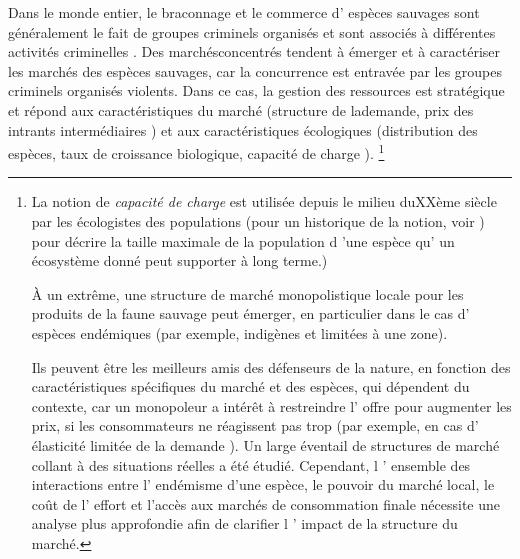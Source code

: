 \begin{displayquote}
\begin{displayquote}
\begin{displayquote}
  Dans le monde entier, le braconnage et le commerce d' espèces sauvages sont généralement le fait de groupes criminels organisés et sont associés à différentes activités criminelles \citep{mozer_introduction_2023}.    Des marchésconcentrés tendent à émerger et à caractériser les marchés des espèces sauvages, car la concurrence est entravée par les groupes criminels organisés violents. Dans ce cas, la gestion des ressources est stratégique et répond aux caractéristiques du marché (structure de lademande, prix des intrants intermédiaires ) et aux caractéristiques écologiques (distribution des espèces, taux de croissance biologique, capacité de charge ). \footnote{La notion de \textit{capacité de charge} est utilisée depuis le milieu duXXème siècle par les écologistes des populations (pour un historique de la notion, voir \cite{sayre_carrying_2008}) pour décrire la taille maximale de la population d 'une espèce qu' un écosystème donné peut supporter à long terme.)

	À un extrême, une structure de marché monopolistique locale pour les produits de la faune sauvage peut émerger, en particulier dans le cas d' espèces endémiques (par exemple, indigènes et limitées à une zone).

Ils peuvent être les meilleurs amis des défenseurs de la nature\citep{solow_resources_1974, hannesson_note_1983}, en fonction des caractéristiques spécifiques du marché et des espèces, qui dépendent du contexte, car un monopoleur a intérêt à restreindre l' offre pour augmenter les prix, si les consommateurs ne réagissent pas trop (par exemple, en cas d' élasticité limitée de la demande ). Un large éventail de structures de marché \citep{damania_economics_2007, hannesson_effects_1985} collant à des situations réelles a été étudié.     Cependant, l ' ensemble des interactions entre l' endémisme d'une espèce, le pouvoir du marché local, le coût de l' effort et l'accès aux marchés de consommation finale nécessite une analyse plus approfondie afin de clarifier l ' impact de la structure du marché.

}
\end{displayquote}
\end{displayquote}
\end{displayquote}
